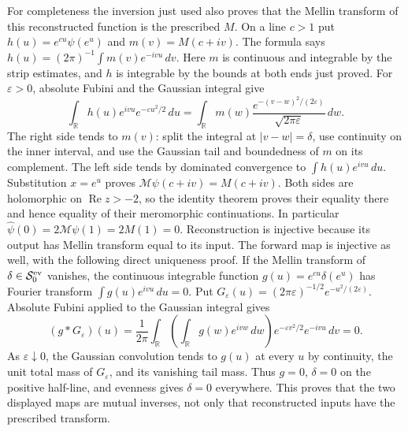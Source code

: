 For completeness the inversion just used also proves that the
Mellin transform of this reconstructed function is the prescribed
$M$. On a line $c>1$ put
$h(u)=e^{cu}\psi(e^u)$ and $m(v)=M(c+iv)$. The formula says
$h(u)=(2\pi)^{-1}\int m(v)e^{-ivu}\,dv$.
Here $m$ is continuous and integrable by the strip estimates,
and $h$ is integrable by the bounds at both ends just proved.
For $\varepsilon>0$, absolute Fubini and the Gaussian integral give
\[
 \int_{\mathbb R}h(u)e^{ivu}e^{-\varepsilon u^2/2}\,du
 =\int_{\mathbb R}m(w)
       \frac{e^{-(v-w)^2/(2\varepsilon)}}{\sqrt{2\pi\varepsilon}}
       \,dw.
\]
The right side tends to $m(v)$: split the integral at
$|v-w|=\delta$, use continuity on the inner interval, and use
the Gaussian tail and boundedness of $m$ on its complement.
The left side tends by dominated convergence to
$\int h(u)e^{ivu}\,du$. Substitution $x=e^u$ proves
$\mathcal M\psi(c+iv)=M(c+iv)$. Both sides are holomorphic
on $\operatorname{Re}z>-2$, so the identity theorem proves
their equality there and hence equality of their meromorphic
continuations. In particular
$\widehat\psi(0)=2\mathcal M\psi(1)=2M(1)=0$.
Reconstruction is injective because its output has Mellin transform
equal to its input. The forward map is injective as well, with
the following direct uniqueness proof. If the Mellin transform of
$\delta\in\mathcal S_0^{\rm ev}$ vanishes, the continuous
integrable function $g(u)=e^{cu}\delta(e^u)$ has Fourier transform
$\int g(u)e^{ivu}\,du=0$. Put
$G_\varepsilon(u)=(2\pi\varepsilon)^{-1/2}
e^{-u^2/(2\varepsilon)}$. Absolute Fubini applied to the Gaussian
integral gives
\[
 (g*G_\varepsilon)(u)=\frac1{2\pi}
 \int_{\mathbb R}\left(\int_{\mathbb R}g(w)e^{ivw}\,dw\right)
                   e^{-\varepsilon v^2/2}e^{-ivu}\,dv=0.
\]
As $\varepsilon\downarrow0$, the Gaussian convolution tends
to $g(u)$ at every $u$ by continuity, the unit total mass of
$G_\varepsilon$, and its vanishing tail mass. Thus $g=0$,
$\delta=0$ on the positive half-line, and evenness gives
$\delta=0$ everywhere. This proves that the two displayed maps
are mutual inverses, not only that reconstructed inputs have the
prescribed transform.

